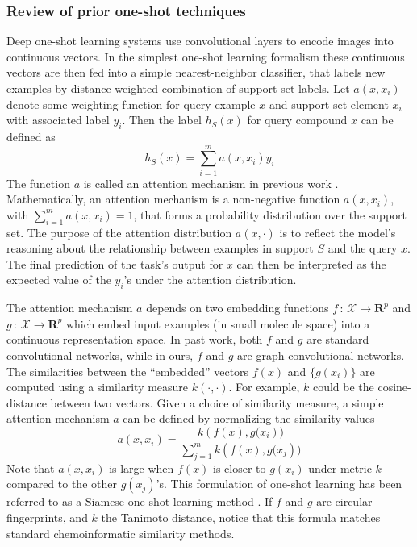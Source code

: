 \documentclass[journal=jacsat,manuscript=article]{achemso}
\begin{document}
\subsubsection{Review of prior one-shot techniques}

Deep one-shot learning systems \cite{santoro2016one, vinyals2016matching} use convolutional layers to encode images into continuous vectors. In the simplest one-shot learning formalism these continuous vectors are then fed into a simple nearest-neighbor classifier, that labels new examples by distance-weighted combination of support set labels. Let $a(x, x_i)$ denote some weighting function for query example $x$ and support set element $x_i$ with associated label $y_i$. Then the label $h_S(x)$ for query compound $x$ can be defined as
\[
h_S(x) = \sum\limits_{i=1}^{m}a\left(x,x_i\right)y_i
\]
The function $a$ is called an attention mechanism in previous work \cite{vinyals2016matching}. Mathematically, an attention mechanism is a non-negative function $a(x,x_i)$, with $\sum\nolimits_{i=1}^{m}a(x,x_i)=1$, that forms a probability distribution over the support set. The purpose of the attention distribution $a(x, \cdot)$ is to reflect the model's reasoning about the relationship between examples in support $S$ and the query $x$. The final prediction of the task's output for $x$ can then be interpreted as the expected value of the $y_i$'s under the attention distribution.

The attention mechanism $a$ depends on two embedding functions $f\,:\,\mathcal{X}\rightarrow\mathbf{R}^p$ and $g\,:\,\mathcal{X}\rightarrow\mathbf{R}^p$ which embed input examples (in small molecule space) into a continuous representation space. In past work, both $f$ and $g$ are standard convolutional networks, while in ours, $f$ and $g$ are graph-convolutional networks. The similarities between the ``embedded'' vectors $f(x)$ and $\{g(x_i)\}$ are computed using a similarity measure $k(\cdot,\cdot)$.  For example, $k$ could be the cosine-distance between two vectors. Given a choice of similarity measure, a simple attention mechanism $a$ can be defined by normalizing the similarity values
\[
a(x,x_i) = \frac{k\left(f(x),g(x_i\right))}{\sum\nolimits_{j=1}^{m} k\left(f(x),g(x_j\right))}
\]
Note that $a(x,x_i)$ is large when $f(x)$ is closer to $g(x_i)$ under metric $k$ compared to the other $g(x_j)$'s. This formulation of one-shot learning has been referred to as a Siamese one-shot learning method \cite{koch2015siamese}. If $f$ and $g$ are circular fingerprints\cite{rogers2010extended}, and $k$ the Tanimoto distance, notice that this formula matches standard chemoinformatic similarity methods.
\end{document}
